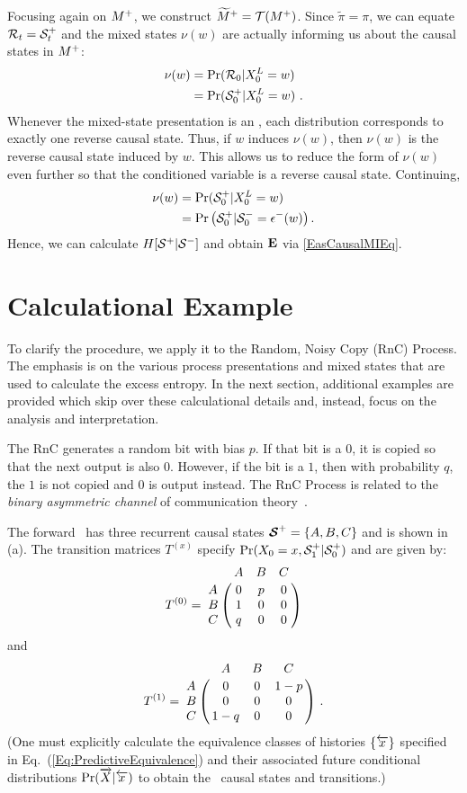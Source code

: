 Focusing again on ${M}^{+}$, we construct $\widetilde{M}^+ = \mathcal{T}({M}^{+})$.
Since $\widetilde{\pi} = \pi$, we can equate 
  $\mathcal{R}_t = {\mathcal{S}}^{+}_t$
and the mixed states $\nu(w)$ are actually
informing us about the causal states in ${M}^{+}$:
\begin{align*}
\nu(w) &= \Pr(\mathcal{R}_0 | {X}_0^L=w)\\
       &= \Pr({\mathcal{S}}^{+}_0 | {X}_0^L=w) ~.
\end{align*}
Whenever the mixed-state presentation is an \eM, each distribution corresponds
to exactly one reverse causal state.  Thus, if $w$ induces $\nu(w)$, then
$\nu(w)$ is the reverse causal state induced by $w$.  This allows us to 
reduce the form of $\nu(w)$ even further so that the conditioned variable 
is a reverse causal state. Continuing,
\begin{align*}
\nu(w) &= \Pr({\mathcal{S}}^{+}_0 | {X}_0^L=w)\\
       &= \Pr\left({\mathcal{S}}^{+}_0 | {\mathcal{S}}^{-}_0 = \epsilon^{-}(w)\right).
\end{align*}
Hence, we can calculate $H[{\mathcal{S}}^{+}|{\mathcal{S}}^{-}]$ and 
obtain ${\bf E}$ via \eqref{EasCausalMIEq}.

\section{Calculational Example}

To clarify the procedure, we apply it to the Random, Noisy Copy (RnC) Process.
The emphasis is on the various process presentations and mixed states that
are used to calculate the excess entropy. In the next section, additional
examples are provided which skip over these calculational details and, instead,
focus on the analysis and interpretation.

The RnC generates a random bit with bias $p$. If that bit is a $0$, it is
copied so that the next output is also $0$. However, if the bit is a $1$, 
then with probability $q$, the $1$ is not copied and $0$ is output 
instead. The RnC Process is related to the \emph{binary asymmetric channel}
of communication theory~\cite{Cove06a}.

The forward \eM\ has three recurrent causal states 
${\boldsymbol{\mathcal{S}}}^{+} = \{A,B,C\}$ and is shown in (a).
The transition matrices $T^{(x)}$ specify
$\Pr({X}_0=x, {\mathcal{S}}^{+}_1|{\mathcal{S}}^{+}_0)$
and are given by:
\begin{equation*}
T^{(0)} = 
\bordermatrix{ 
  & A & B & C\cr
A & 0 & p & 0\cr
B & 1 & 0 & 0\cr
C & q & 0 & 0
} \\
\end{equation*}
and
\begin{equation*}
T^{(1)} = 
\bordermatrix{ 
  & A & B & C\cr
A & 0 & 0 & 1-p\cr
B & 0 & 0 & 0\cr
C & 1-q & 0 & 0
} ~.
\end{equation*}
(One must explicitly calculate the equivalence classes of histories $\{{\overleftarrow {{x}}}\}$
specified in Eq.~(\ref{Eq:PredictiveEquivalence}) and their associated future
conditional distributions $\Pr(\overrightarrow{{X}}|{\overleftarrow {{x}}})$ to obtain the \eM\ causal states
and transitions.)

